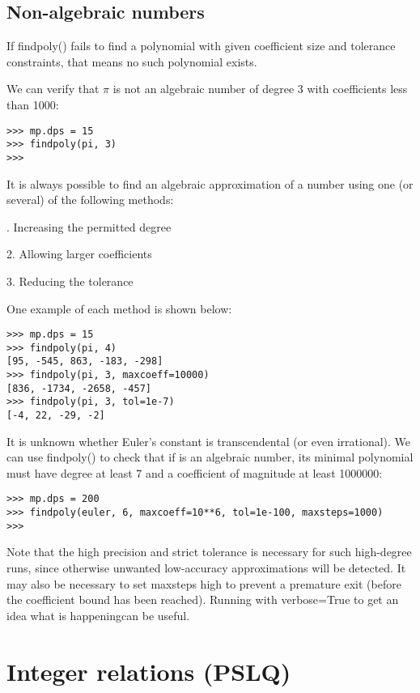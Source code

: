 \subsection{Non-algebraic numbers}

If findpoly() fails to find a polynomial with given coefficient size and tolerance constraints, that means no such polynomial exists.

\vpara
We can verify that $\pi$ is not an algebraic number of degree 3 with coefficients less than 1000:

\begin{lstlisting}
>>> mp.dps = 15
>>> findpoly(pi, 3)
>>>
\end{lstlisting}


It is always possible to find an algebraic approximation of a number using one (or several) of the following methods:

. Increasing the permitted degree

2. Allowing larger coefficients

3. Reducing the tolerance

\vpara
One example of each method is shown below:

\begin{lstlisting}
>>> mp.dps = 15
>>> findpoly(pi, 4)
[95, -545, 863, -183, -298]
>>> findpoly(pi, 3, maxcoeff=10000)
[836, -1734, -2658, -457]
>>> findpoly(pi, 3, tol=1e-7)
[-4, 22, -29, -2]
\end{lstlisting}


It is unknown whether Euler's constant is transcendental (or even irrational). We can use findpoly() to check that if is an algebraic number, its minimal polynomial must have degree at least 7 and a coefficient of magnitude at least 1000000:

\begin{lstlisting}
>>> mp.dps = 200
>>> findpoly(euler, 6, maxcoeff=10**6, tol=1e-100, maxsteps=1000)
>>>
\end{lstlisting}


Note that the high precision and strict tolerance is necessary for such high-degree runs, since otherwise unwanted low-accuracy approximations will be detected. It may also be necessary to set maxsteps high to prevent a premature exit (before the coefficient bound has been reached). Running with verbose=True to get an idea what is happeningcan be useful.


\newpage
\section{Integer relations (PSLQ)}

